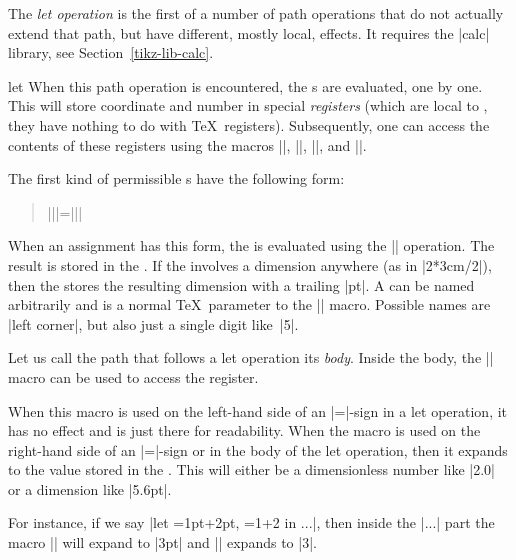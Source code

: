 The \emph{let operation} is the first of a number of path operations that do
not actually extend that path, but have different, mostly local, effects.
It requires the |calc| library, see Section~\ref{tikz-lib-calc}.

\begin{pathoperation}{let}{
        }
    When this path operation is encountered, the s are
    evaluated, one by one. This will store coordinate and number in
    special \emph{registers} (which are local to \tikzname, they have
    nothing to do with \TeX\ registers). Subsequently, one can access the
    contents of these registers using the macros |\p|, |\x|, |\y|, and
    |\n|.

    The first kind of permissible s have the following form:
    \begin{quote}
        |\n||={||}|
    \end{quote}
    When an assignment has this form, the  is evaluated using the
    |\pgfmathparse| operation. The result is stored in the . If the  involves a dimension anywhere (as in
    |2*3cm/2|), then the  stores the resulting dimension
    with a trailing |pt|.  A  can be named arbitrarily
    and is a normal \TeX\ parameter to the |\n| macro. Possible names are
    |{left corner}|, but also just a single digit like~|5|.

    Let us call the path that follows a let operation its \emph{body}. Inside
    the body, the |\n| macro can be used to access the register.
    \begin{command}{\n{}}
        When this macro is used on the left-hand side of an |=|-sign in a let
        operation, it has no effect and is just there for readability. When the
        macro is used on the right-hand side of an |=|-sign or in the body of
        the let operation, then it expands to the value stored in the
        . This will either be a dimensionless number like
        |2.0| or a dimension like |5.6pt|.

        For instance, if we say |let ={1pt+2pt}, ={1+2} in ...|, then
        inside the |...| part the macro || will expand to |3pt| and ||
        expands to |3|.
    \end{command}


\end{pathoperation}
